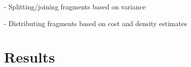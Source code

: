 \documentclass{tufte-book} %
\begin{document}
- Splitting/joining fragments based on variance

- Distributing fragments based on cost and density estimates

\section{Results}

\backmatter



\end{document}
